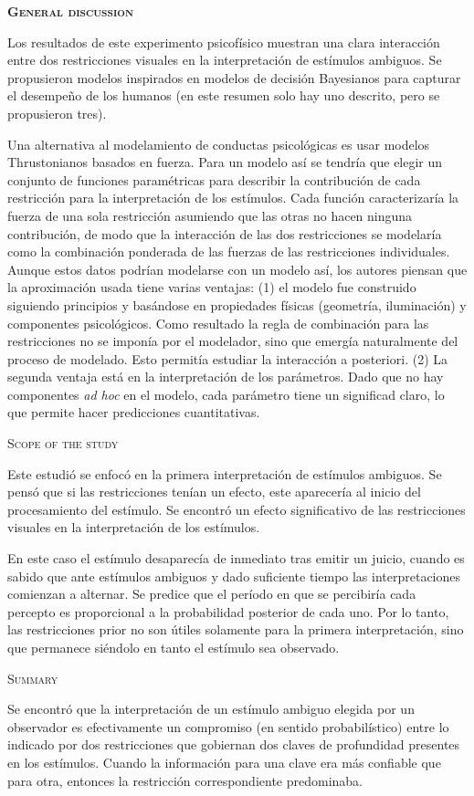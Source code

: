 \documentclass[a4paper,12pt]{article}
\begin{document}
{\scshape\bfseries General discussion}

Los resultados de este experimento psicofísico muestran una clara interacción entre dos restricciones visuales en la interpretación de estímulos ambiguos. Se propusieron modelos inspirados en modelos de decisión Bayesianos para capturar el desempeño de los humanos (en este resumen solo hay uno descrito, pero se propusieron tres).

Una alternativa al modelamiento de conductas psicológicas es usar modelos Thrustonianos basados en fuerza. Para un modelo así se tendría que elegir un conjunto de funciones paramétricas para describir la contribución de cada restricción para la interpretación de los estímulos. Cada función caracterizaría la fuerza de una sola restricción asumiendo que las otras no hacen ninguna contribución, de modo que la interacción de las dos restricciones se modelaría como la combinación ponderada de las fuerzas de las restricciones individuales. Aunque estos datos podrían modelarse con un modelo así, los autores piensan que la aproximación usada tiene varias ventajas: (1) el modelo fue construido siguiendo principios y basándose en propiedades físicas (geometría, iluminación) y componentes psicológicos. Como resultado la regla de combinación para las restricciones no se imponía por el modelador, sino que emergía naturalmente del proceso de modelado. Esto permitía estudiar la interacción a posteriori. (2) La segunda ventaja está en la interpretación de los parámetros. Dado que no hay componentes {\itshape ad hoc} en el modelo, cada parámetro tiene un significad claro, lo que permite hacer predicciones cuantitativas.

{\scshape Scope of the study}

Este estudió se enfocó en la primera interpretación de estímulos ambiguos. Se pensó que si las restricciones tenían un efecto, este aparecería al inicio del procesamiento del estímulo. Se encontró un efecto significativo de las restricciones visuales en la interpretación de los estímulos.

En este caso el estímulo desaparecía de inmediato tras emitir un juicio, cuando es sabido que ante estímulos ambiguos y dado suficiente tiempo las interpretaciones comienzan a alternar. Se predice que el período en que se percibiría cada percepto es proporcional a la probabilidad posterior de cada uno. Por lo tanto, las restricciones prior no son útiles solamente para la primera interpretación, sino que permanece siéndolo en tanto el estímulo sea observado.

{\scshape Summary}

Se encontró que la interpretación de un estímulo ambiguo elegida por un observador es efectivamente un compromiso (en sentido probabilístico) entre lo indicado por dos restricciones que gobiernan dos claves de profundidad presentes en los estímulos. Cuando la información para una clave era más confiable que para otra, entonces la restricción correspondiente predominaba.
\end{document}
